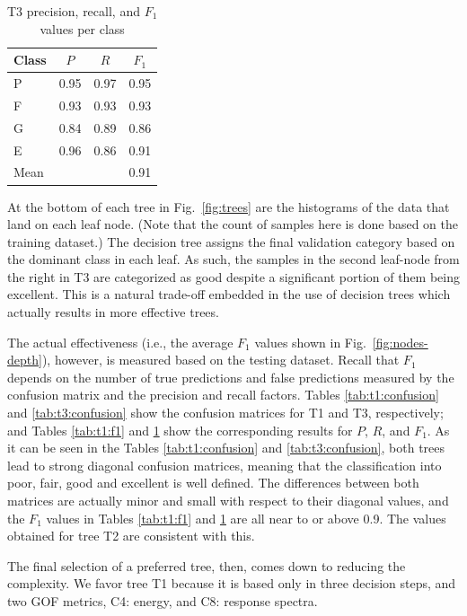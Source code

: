 \begin{table}
	\centering
	\caption{T3 precision, recall, and $F_1$ values per class}
	\label{tab:t3:f1}
	\small
	\begin{tabular}{lccc}
	Class   & $P$	& $R$  	& $F_1$ \\ 
	\hline
	P 		& 0.95 	& 0.97 	& 0.95 	\\
	F 		& 0.93 	& 0.93 	& 0.93 	\\
	G 		& 0.84 	& 0.89 	& 0.86 	\\
	E 		& 0.96 	& 0.86 	& 0.91 	\\
	\hline
	Mean 	&		&		& 0.91	\\
	\end{tabular}
\end{table}

At the bottom of each tree in Fig.~\ref{fig:trees} are the histograms of the data that land on each leaf node. (Note that the count of samples here is done based on the training dataset.) The decision tree assigns the final validation category based on the dominant class in each leaf. As such, the samples in the second leaf-node from the right in T3 are categorized as good despite a significant portion of them being excellent. This is a natural trade-off embedded in the use of decision trees which actually results in more effective trees. 

The actual effectiveness (i.e., the average $F_1$ values shown in Fig.~\ref{fig:nodes-depth}), however, is measured based on the testing dataset. Recall that $F_1$ depends on the number of true predictions and false predictions measured by the confusion matrix and the precision and recall factors. Tables \ref{tab:t1:confusion} and \ref{tab:t3:confusion} show the confusion matrices for T1 and T3, respectively; and Tables \ref{tab:t1:f1} and \ref{tab:t3:f1} show the corresponding results for $P$, $R$, and $F_1$. As it can be seen in the Tables \ref{tab:t1:confusion} and \ref{tab:t3:confusion}, both trees lead to strong diagonal confusion matrices, meaning that the classification into poor, fair, good and excellent is well defined. The differences between both matrices are actually minor and small with respect to their diagonal values, and the $F_1$ values in Tables \ref{tab:t1:f1} and \ref{tab:t3:f1} are all near to or above 0.9. The values obtained for tree T2 are consistent with this.

The final selection of a preferred tree, then, comes down to reducing the complexity. We favor tree T1 because it is based only in three decision steps, and two GOF metrics, C4: energy, and C8: response spectra.


